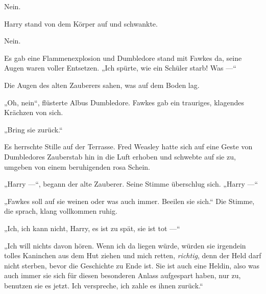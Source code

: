Nein.

Harry stand von dem Körper auf und schwankte.

Nein.

Es gab eine Flammenexplosion und Dumbledore stand mit Fawkes da, seine Augen waren voller Entsetzen.
„Ich spürte, wie ein Schüler starb! Was —“

Die Augen des alten Zauberers sahen, was auf dem Boden lag.

„Oh, nein“, flüsterte Albus Dumbledore. Fawkes gab ein trauriges, klagendes Krächzen von sich.

„Bring sie zurück.“

Es herrschte Stille auf der Terrasse. Fred Weasley hatte sich auf eine Geste von Dumbledores Zauberstab hin in die Luft erhoben und schwebte auf sie zu, umgeben von einem beruhigenden rosa Schein.

„Harry —“, begann der alte Zauberer. Seine Stimme überschlug sich.
„Harry —“

„Fawkes soll auf sie weinen oder was auch immer. Beeilen sie sich.“ Die Stimme, die sprach, klang vollkommen ruhig.

„Ich, ich kann nicht, Harry, es ist zu spät, sie ist tot —“

„Ich will nichts davon hören. Wenn ich da liegen würde, würden sie irgendein tolles Kaninchen aus dem Hut ziehen und mich retten, \emph{richtig}, denn der Held darf nicht sterben, bevor die Geschichte zu Ende ist. Sie ist auch eine Heldin, also was auch immer sie sich für diesen besonderen Anlass aufgespart haben, nur zu, benutzen sie es jetzt. Ich verspreche, ich zahle es ihnen zurück.“


